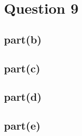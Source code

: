 \documentclass[a4paper]{article}
\begin{document}
\section*{Question 9}
\subsection*{part(b)}
\begin{stlog}\end{stlog}
\subsection*{part(c)}
\begin{stlog}\end{stlog}
\subsection*{part(d)}
\begin{stlog}\end{stlog}
\subsection*{part(e)}
\begin{stlog}\end{stlog}
\end{document}
